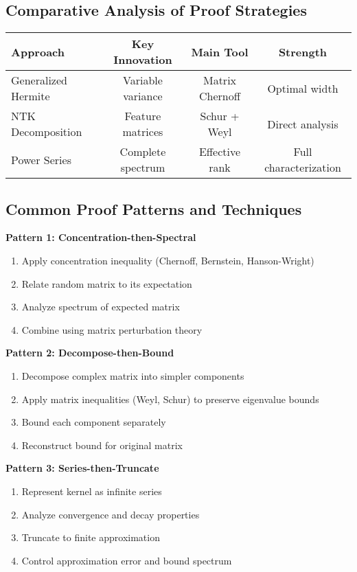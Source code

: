\documentclass{article}
\begin{document}
\subsection{Comparative Analysis of Proof Strategies}

\begin{table}[h]
\centering
\begin{tabular}{|l|c|c|c|}
\hline
\textbf{Approach} & \textbf{Key Innovation} & \textbf{Main Tool} & \textbf{Strength} \\
\hline
Generalized Hermite & Variable variance & Matrix Chernoff & Optimal width \\
\hline
NTK Decomposition & Feature matrices & Schur + Weyl & Direct analysis \\
\hline
Power Series & Complete spectrum & Effective rank & Full characterization \\
\hline
\end{tabular}
\end{table}

\subsection{Common Proof Patterns and Techniques}

\textbf{Pattern 1: Concentration-then-Spectral}
\begin{enumerate}
    \item Apply concentration inequality (Chernoff, Bernstein, Hanson-Wright)
    \item Relate random matrix to its expectation
    \item Analyze spectrum of expected matrix
    \item Combine using matrix perturbation theory
\end{enumerate}

\textbf{Pattern 2: Decompose-then-Bound}
\begin{enumerate}
    \item Decompose complex matrix into simpler components
    \item Apply matrix inequalities (Weyl, Schur) to preserve eigenvalue bounds
    \item Bound each component separately
    \item Reconstruct bound for original matrix
\end{enumerate}

\textbf{Pattern 3: Series-then-Truncate}
\begin{enumerate}
    \item Represent kernel as infinite series
    \item Analyze convergence and decay properties
    \item Truncate to finite approximation
    \item Control approximation error and bound spectrum
\end{enumerate}
\end{document}
